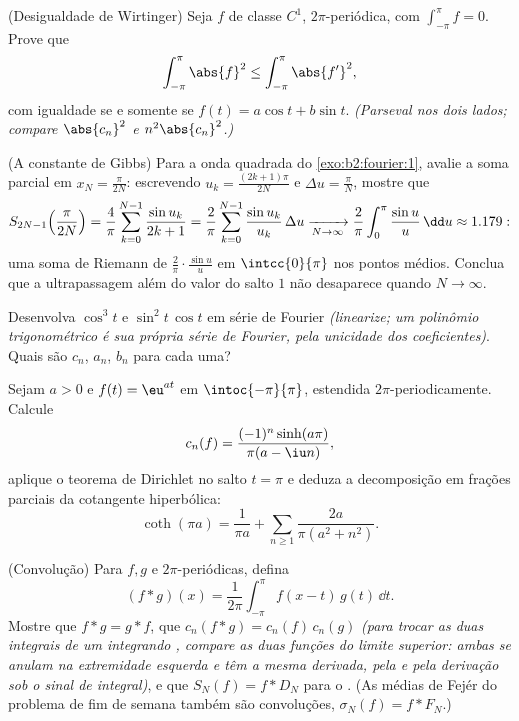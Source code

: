 \begin{exercise}[$\star\star\star$]\label{exo:b2:fourier:7}
(Desigualdade de Wirtinger) Seja $f$ de classe $C^1$, $2\pi$-periódica, com
$\int_{-\pi}^{\pi} f = 0$. Prove que
\[
\int_{-\pi}^{\pi} \abs{f}^2 \leq \int_{-\pi}^{\pi} \abs{f'}^2 ,
\]
com igualdade se e somente se $f(t) = a\cos t + b\sin t$. \emph{(Parseval nos
dois lados; compare $\abs{c_n}^2$ e $n^2\abs{c_n}^2$.)}
\end{exercise}

\begin{exercise}[$\star\star\star$]\label{exo:b2:fourier:8}
(A constante de Gibbs) Para a onda quadrada do
\cref{exo:b2:fourier:1}, avalie a soma parcial em $x_N =
\frac{\pi}{2N}$: escrevendo $u_k = \frac{(2k+1)\pi}{2N}$ e $\Delta u
= \frac{\pi}{N}$, mostre que
\[
S_{2N-1}\Bigl(\frac{\pi}{2N}\Bigr)
= \frac{4}{\pi}\sum_{k=0}^{N-1} \frac{\sin u_k}{2k+1}
= \frac{2}{\pi}\sum_{k=0}^{N-1} \frac{\sin u_k}{u_k}\,\Delta u
\xrightarrow[N\to\infty]{}
\frac{2}{\pi}\int_0^{\pi}\frac{\sin u}{u}\,\dd u \approx 1.179 :
\]
uma soma de Riemann de $\frac{2}{\pi}\cdot\frac{\sin u}{u}$ em
$\intcc{0}{\pi}$ nos pontos médios. Conclua que a ultrapassagem além
do valor do salto $1$ não desaparece quando $N \to \infty$.
\end{exercise}

\begin{exercise}[$\star$]\label{exo:b2:fourier:9}
Desenvolva $\cos^3 t$ e $\sin^2 t\,\cos t$ em série de Fourier
\emph{(linearize; um polinômio trigonométrico é sua própria série de
Fourier, pela unicidade dos coeficientes)}. Quais são $c_n$,
$a_n$, $b_n$ para cada uma?
\end{exercise}

\begin{exercise}[$\star\star$]\label{exo:b2:fourier:10}
Sejam $a > 0$ e $f(t) = \eu^{at}$ em $\intoc{-\pi}{\pi}$,
estendida $2\pi$-periodicamente. Calcule
\[
c_n(f) = \frac{(-1)^n\sinh(a\pi)}{\pi(a - \iu n)} ,
\]
aplique o teorema de Dirichlet no salto $t = \pi$ e deduza a
decomposição em frações parciais da cotangente hiperbólica:
\[
\coth(\pi a) = \frac{1}{\pi a} + \sum_{n\geq1}
\frac{2a}{\pi(a^2 + n^2)} .
\]
\end{exercise}

\begin{exercise}[$\star\star$]\label{exo:b2:fourier:11}
(Convolução) Para $f, g$  e $2\pi$-periódicas, defina
\[
(f * g)(x) = \frac{1}{2\pi}\int_{-\pi}^{\pi} f(x - t)\,g(t)\,
\dd t .
\]
Mostre que $f * g = g * f$, que $c_n(f*g) = c_n(f)\,c_n(g)$
\emph{(para trocar as duas integrais de um integrando ,
compare as duas funções do limite superior: ambas se anulam na
extremidade esquerda e têm a mesma derivada, pela  e pela
derivação sob o sinal de integral)}, e que $S_N(f) =
f * D_N$ para o . (As médias de
Fejér do problema de fim de semana também são convoluções, $\sigma_N(f) = f *
F_N$.)
\end{exercise}

